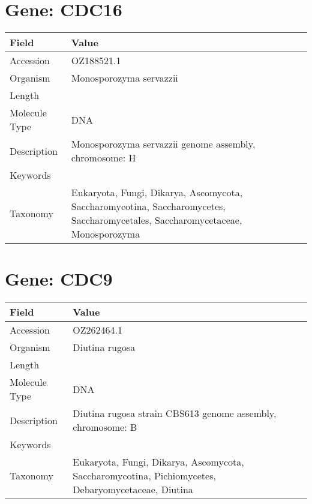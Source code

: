 \documentclass[10pt]{article}
\begin{document}
\section{Gene: CDC16}
{\footnotesize
\begin{longtable}{>{\raggedright\arraybackslash}p{4.5cm} >{\raggedright\arraybackslash}p{11.5cm}}
\textbf{Field} & \textbf{Value} \\
\hline
Accession & OZ188521.1 \\
Organism & Monosporozyma servazzii \\
Length & 901057 \\
Molecule Type & DNA \\
Description & Monosporozyma servazzii genome assembly, chromosome: H \\
Keywords &  \\
Taxonomy & Eukaryota, Fungi, Dikarya, Ascomycota, Saccharomycotina, Saccharomycetes, Saccharomycetales, Saccharomycetaceae, Monosporozyma \\
\end{longtable}
}

\vspace{1em}
\section{Gene: CDC9}
{\footnotesize
\begin{longtable}{>{\raggedright\arraybackslash}p{4.5cm} >{\raggedright\arraybackslash}p{11.5cm}}
\textbf{Field} & \textbf{Value} \\
\hline
Accession & OZ262464.1 \\
Organism & Diutina rugosa \\
Length & 1704689 \\
Molecule Type & DNA \\
Description & Diutina rugosa strain CBS613 genome assembly, chromosome: B \\
Keywords &  \\
Taxonomy & Eukaryota, Fungi, Dikarya, Ascomycota, Saccharomycotina, Pichiomycetes, Debaryomycetaceae, Diutina \\
\end{longtable}
}

\vspace{1em}
\end{document}
